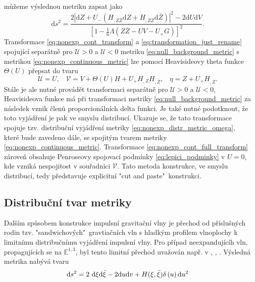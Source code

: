 můžeme výslednou metriku zapsat jako
\begin{equation}
    \label{eq:nonexp_continuous_metric}
    \mathrm{d} s^{2}=\frac{2\left|\mathrm{d} Z+U_-\left(H_{, Z \bar{Z}} 
    \mathrm{d} Z+H_{, \bar{Z} \bar{Z}} \mathrm{d} \bar{Z}\right)\right|^{2}-2 \mathrm{d} U 
    \mathrm{d} V}{\left[1-\frac{1}{6} \Lambda(Z \bar{Z}-U V-U_+ G)\right]^{2}}.
\end{equation}
Transformace \eqref{eq:nonexp_cont_transform} a \eqref{eq:transformation_just_rename} spojující separátně pro $\mathcal{U}>0$ a $\mathcal{U}<0$ metriku \eqref{eq:null_background_metric}
s metrikou \eqref{eq:nonexp_continuous_metric} lze pomocí Heavisideovy theta funkce $\Theta(U)$ přepsat do tvaru 
\begin{equation}
    \label{eq:nonexp_cont_full_transform}
    \mathcal{U}=U,~~~~ \mathcal{V}=V+\Theta(U) H + U_+ H_{,Z}H_{,\bar{Z}},~~~~ \eta=Z+ U_+ H_{,\bar{Z}}.
\end{equation}
Stále je ale nutné provádět transformaci separátně pro $\mathcal{U}>0$ a $\mathcal{U}<0$, Heavisideova funkce
má při transformaci metriky \eqref{eq:null_background_metric} za následek vznik členů proporcionálních delta funkci. Je také nutné podotknout,
že toto vyjádření je pak ve smyslu distribucí.
Ukazuje se, že tato transformace spojuje tzv. distribuční vyjádření metriky \eqref{eq:nonexp_distr_metric_omega}, které bude zavedeno dále,
se spojitým tvarem metriky \eqref{eq:nonexp_continuous_metric}.
Transformace \eqref{eq:nonexp_cont_full_transform} zároveň obsahuje Penroseovy spojovací podmínky \eqref{eq:lepici_podminky} v $U=0$, kde
vzniká nespojitost v souřadnici $\mathcal{V}$. Tato metoda konstrukce, ve smyslu distribucí, tedy představuje explicitní "cut and paste"\ konstrukci.


\subsection{Distribuční tvar metriky}
Dalším způsobem konstrukce impulsní gravitační vlny je přechod od příslušných rodin tzv. "sandwichových"\
gravtiačních vln s hladkým profilem vlnoplochy k limitnímu distribučnímu vyjádření impulsní vlny. Pro případ neexpandujícíh vln, propagujících se
na $\mathbb{E}^{1,3}$, byl tento limitní přechod uvažován např. v \cite{Penrose1968TwistorQuant}, \cite{Podolsky_1998}, \cite{Podolsky_1998_nonexpanding}.
Výsledná metrika nabývá tvaru
\begin{equation}
    \mathrm{d} s^2 = 2~ \mathrm{d} \xi \mathrm{d} \bar{\xi} - 2 \mathrm{d} u \mathrm{d} v + H(\xi, \bar{\xi}) \delta\left( u\right) \mathrm{d} u^2
\end{equation}

